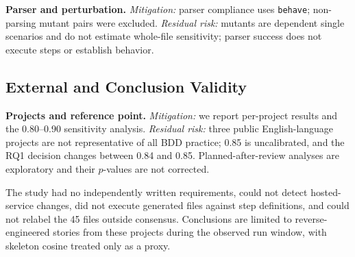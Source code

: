 \textbf{Parser and perturbation.} \emph{Mitigation:} parser compliance uses \texttt{behave}; non-parsing mutant pairs were excluded. \emph{Residual risk:} mutants are dependent single scenarios and do not estimate whole-file sensitivity; parser success does not execute steps or establish behavior.

\subsection{External and Conclusion Validity}

\textbf{Projects and reference point.} \emph{Mitigation:} we report per-project results and the 0.80--0.90 sensitivity analysis. \emph{Residual risk:} three public English-language projects are not representative of all BDD practice; 0.85 is uncalibrated, and the RQ1 decision changes between 0.84 and 0.85. Planned-after-review analyses are exploratory and their $p$-values are not corrected.

The study had no independently written requirements, could not detect hosted-service changes, did not execute generated files against step definitions, and could not relabel the 45 files outside consensus. Conclusions are limited to reverse-engineered stories from these projects during the observed run window, with skeleton cosine treated only as a proxy.
